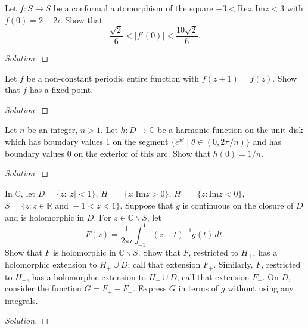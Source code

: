\documentclass[10pt]{article}
\newenvironment{soln}{\begin{proof}[Solution]}{\end{proof}}
\begin{document}
\begin{problem}
[1998 J-I-3]
Let $f:S\rightarrow S$ be a conformal automorphism of the square $-3<\text{Re}z,\text{Im}z<3$ with $f(0)=2+2i$. Show that
$$
\frac{\sqrt2}{6}<|f'(0)|<\frac{10\sqrt2}{6}.
$$
\end{problem}

\begin{soln}

\end{soln}



\begin{problem}
[1998 J-I-4]
Let $f$ be a non-constant periodic entire function with $f(z+1)=f(z)$. Show that $f$ has a fixed point.
\end{problem}

\begin{soln}

\end{soln}



\begin{problem}
[1998 J-II-4]
Let $n$ be an integer, $n>1$. Let $h:D\rightarrow\mathbb{C}$ be a harmonic function on the unit disk which has boundary values $1$ on the segment $\{e^{i\theta}\mid \theta\in(0,2\pi/n)\}$ and has boundary values $0$ on the exterior of this arc. Show that $h(0)=1/n$.
\end{problem}

\begin{soln}

\end{soln}



\begin{problem}
[1998 A-I-2]
In $\mathbb{C}$, let $D=\{z:|z|<1\}$, $H_+=\{z:\text{Im}z>0\}$, $H_-=\{z:\text{Im}z<0\}$, $S=\{z:z\in\mathbb{R}\text{ and }-1< z<1\}$. Suppose that $g$ is continuous on the closure of $D$ and is holomorphic in $D$. For $z\in\mathbb{C}\backslash S$, let
$$
F(z)=\frac{1}{2\pi i}\int_{-1}^{1}(z-t)^{-1}g(t)\,dt.
$$ Show that $F$ is holomorphic in $\mathbb{C}\backslash S$. Show that $F$, restricted to $H_+$, has a holomorphic extension to $H_+\cup D$; call that extension $F_+$. Similarly, $F$, restricted to $H_-$, has a holomorphic extension to $H_-\cup D$; call that extension $F_-$. On $D$, consider the function $G=F_+-F_-$. Express $G$ in terms of $g$ without using any integrals.
\end{problem}

\begin{soln}

\end{soln}
\end{document}
